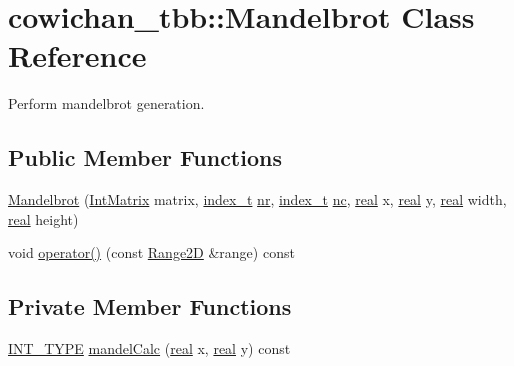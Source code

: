 \hypertarget{classcowichan__tbb_1_1_mandelbrot}{
\section{cowichan\_\-tbb::Mandelbrot Class Reference}
\label{classcowichan__tbb_1_1_mandelbrot}
}
Perform mandelbrot generation.  


\subsection*{Public Member Functions}
\begin{CompactItemize}
\item 
\hyperlink{classcowichan__tbb_1_1_mandelbrot_2bfef0a80393e6547fb979f1d2135de6}{Mandelbrot} (\hyperlink{cowichan_8hpp_82321152ddeeefe9c61350a42ed9e7af}{IntMatrix} matrix, \hyperlink{cowichan_8hpp_5b04577d5d21124855deaad298595371}{index\_\-t} \hyperlink{classcowichan__tbb_1_1_mandelbrot_698768b13a40cbab1410a4e162d1e450}{nr}, \hyperlink{cowichan_8hpp_5b04577d5d21124855deaad298595371}{index\_\-t} \hyperlink{classcowichan__tbb_1_1_mandelbrot_6eed478f27f441f57438392515f0f575}{nc}, \hyperlink{cowichan_8hpp_4d521b2c54a1f6312cc8fa04827eaf98}{real} x, \hyperlink{cowichan_8hpp_4d521b2c54a1f6312cc8fa04827eaf98}{real} y, \hyperlink{cowichan_8hpp_4d521b2c54a1f6312cc8fa04827eaf98}{real} width, \hyperlink{cowichan_8hpp_4d521b2c54a1f6312cc8fa04827eaf98}{real} height)
\item 
void \hyperlink{classcowichan__tbb_1_1_mandelbrot_5c8093ee0a5690df3260109e03174f97}{operator()} (const \hyperlink{cowichan__tbb_8hpp_e591b8e6980ddc5982ee22655da2ab8e}{Range2D} \&range) const 
\end{CompactItemize}
\subsection*{Private Member Functions}
\begin{CompactItemize}
\item 
\hyperlink{cowichan_8hpp_c96945095fd0ce7186a1d00a89f77d2c}{INT\_\-TYPE} \hyperlink{classcowichan__tbb_1_1_mandelbrot_12f71733227567ee4519921eb42e505b}{mandelCalc} (\hyperlink{cowichan_8hpp_4d521b2c54a1f6312cc8fa04827eaf98}{real} x, \hyperlink{cowichan_8hpp_4d521b2c54a1f6312cc8fa04827eaf98}{real} y) const 
\end{CompactItemize}
